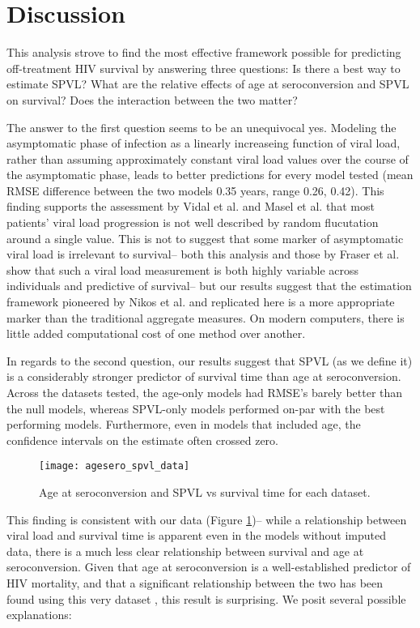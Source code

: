 \documentclass[12pt, titlepage, proquest]{article}
\begin{document}
\section{Discussion}

This analysis strove to find the most effective framework possible for predicting off-treatment HIV survival by answering three questions: Is there a best way to estimate SPVL? What are the relative effects of age at seroconversion and SPVL on survival? Does the interaction between the two matter?

The answer to the first question seems to be an unequivocal yes. Modeling the asymptomatic phase of infection as a linearly increaseing function of viral load, rather than assuming approximately constant viral load values over the course of the asymptomatic phase, leads to better predictions for every model tested (mean RMSE difference between the two models 0.35 years, range 0.26, 0.42). This finding supports the assessment by Vidal et al. \cite{vidal_lack_1998} and Masel et al. \cite{masel_fluctuations_2000} that most patients' viral load progression is not well described by random flucutation around a single value. This is not to suggest that some marker of asymptomatic viral load is irrelevant to survival-- both this analysis and those by Fraser et al. show that such a viral load measurement is both highly variable across individuals and predictive of survival-- but our results suggest that the estimation framework pioneered by Nikos et al. and replicated here is a more appropriate marker than the traditional aggregate measures. On modern computers, there is little added computational cost of one method over another.

In regards to the second question, our results suggest that SPVL (as we define it) is a considerably stronger predictor of survival time than age at seroconversion. Across the datasets tested, the age-only models had RMSE's barely better than the null models, whereas SPVL-only models performed on-par with the best performing models. Furthermore, even in models that included age, the confidence intervals on the estimate often crossed zero. 

\begin{figure}
	\caption{Age at seroconversion and SPVL vs survival time for each dataset.}
	\label{agesero_spvl_data}
		\texttt{[image: agesero\_spvl\_data]}
\end{figure}

This finding is consistent with our data (Figure \ref{agesero_spvl_data})-- while a relationship between viral load and survival time is apparent even in the models without imputed data, there is a much less clear relationship between survival and age at seroconversion. Given that age at seroconversion is a well-established predictor of HIV mortality, and that a significant relationship between the two has been found using this very dataset \cite{_time_2000}, this result is surprising. We posit several possible explanations:
\end{document}
